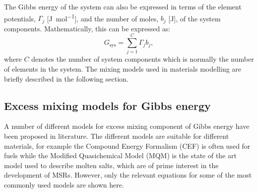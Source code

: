 	The Gibbs energy of  the system can also be expressed in terms of the element potentials, $\Gamma_j$ [\si{\joule \per \mole}], and the number of moles, $b_j$ [\si{\joule}], of the system components. Mathematically, this can be expressed as:
	\begin{equation}\label{eq:elempot}
        		G_\text{sys} = \sum_{j=1}^{C} \Gamma_j b_j,
    	\end{equation}
	where $C$ denotes the number of system components which is normally the number of elements in the system. The mixing models used in materials modelling are briefly described in the following section.

	\subsection{Excess mixing models for Gibbs energy}
	A number of different models for excess mixing component of Gibbs energy have been proposed in literature. The different models are suitable for different materials, for example the Compound Energy Formalism (CEF) is often used for  fuels while the Modified Quasichemical Model (MQM) is the state of the art model used to describe molten salts, which are of prime interest in the development of MSRs. However, only the relevant equations for some of the most commonly used models are shown here.
